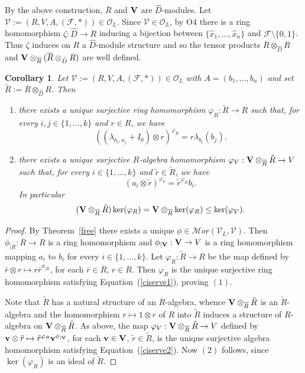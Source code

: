\documentclass[a4paper]{amsart}
\newtheorem{cor}[lemma]{Corollary}
\newcommand{\Ro}{{\overline R}}
\newcommand{\Vo}{{\bf V}}
\newcommand{\lm}{\lambda}
\newcommand{\bv}{{\bf v}}
\begin{document}
By the above construction, $\Ro$ and $\Vo$ are $\hat D$-modules. Let ${\mathcal V}:=(R, V, A, (\mathcal F, \ast)) \in {\mathcal O}_{L}$. 
Since ${\mathcal V}\in {\mathcal O}_{L}$, by O4 there is a ring homomorphism $\zeta: \hat D\to R$ inducing a bijection between $\{\hat x_1, \ldots , \hat x_n\}$ and $\mathcal F\setminus \{0,1\}$. Thus $\zeta$ induces on $R$ a $\hat D$-module  structure and so the tensor products $\Ro\otimes_{\hat D} R$ and $\Vo\otimes_{\Ro}(\Ro\otimes_{\hat D} R) $ are well defined.


\begin{cor}\label{tensor}
Let ${\mathcal V}:=(R, V, A, (\mathcal F, \ast)) \in {\mathcal O}_{L}$ with $A=(b_1, \ldots , b_n)$ and set $\tilde{R}:=\Ro\otimes_{\hat D}R$.  Then
\begin{enumerate}
\item  there exists a unique surjective ring homomorphism $\varphi_R: \tilde R \to R$ such that, for every $i,j\in \{1, \ldots , k\}$ and $r\in R$, we have
\begin{equation}\label{ciserve1}
((\lm_{\hat a_i, \hat a_j}+I_0)\otimes r)^{\varphi_R}=r\lm_{b_i}(b_j).
\end{equation}
\item   there exists a unique surjective $R$-algebra homomorphism $\varphi_V: \Vo\otimes_{\Ro}\tilde R \to V$ such that, for every $i \in \{1, \ldots , k\}$ and $\tilde r\in \tilde R$, we have
\begin{equation}\label{ciserve2}
(a_i\otimes \tilde r)^{\varphi_V}=\tilde{r}^{\varphi_R}b_i.
\end{equation} 
In particular 
\begin{equation}\label{ciserve3}
(\Vo\otimes_{\Ro}\tilde R )\ker(\varphi_R)= \Vo\otimes_{\Ro} \ker(\varphi_R)\leq \ker (\varphi_V).
\end{equation}
\end{enumerate}
\end{cor}

\begin{proof}
By Theorem~\ref{free} there exists a unique $\phi\in \mathcal Mor(\mathcal V_L, \mathcal V)$. Then $\phi_{|\Ro}:\Ro\to R$ is a ring homomorphism and $\phi_{|\Vo}:\Vo\to V$ is a ring homomorphism mapping $a_i$ to $b_i$ for every $i\in \{1, \ldots , k\}$. Let $\varphi_R: {\tilde R} \to R$ be the map  defined by $\bar r\otimes r\mapsto r\bar r^{\phi_{|\Ro}}$, for each $\bar r \in \Ro$, $r\in R$. Then $\varphi_R$  is the unique surjective ring homomorphism satisfying Equation~(\ref{ciserve1}), proving $(1)$. 

Note that $\tilde R$ has a natural structure of an $\Ro$-algebra, whence $\Vo\otimes_{\Ro}\tilde R$ is an $\tilde R$-algebra and the homomorphism $r\mapsto 1\otimes r$ of $R$ into $\tilde R$ induces a structure of $R$-algebra on $\Vo\otimes_{\Ro}\tilde R$. As above, the map $\varphi_V: \Vo\otimes_{\Ro}\tilde R \to V$ defined by $\bv\otimes \tilde r\mapsto \tilde r^{\varphi_R} \bv^{\phi_{|\Vo}}$, for each $\bv \in \Vo$, $\tilde r\in \tilde R$, is the unique surjective algebra homomorphism  satisfying Equation~(\ref{ciserve2}). Now $(2)$ follows, since $\ker (\varphi_R)$ is an ideal of $\tilde R$. 
\end{proof}
\end{document}
